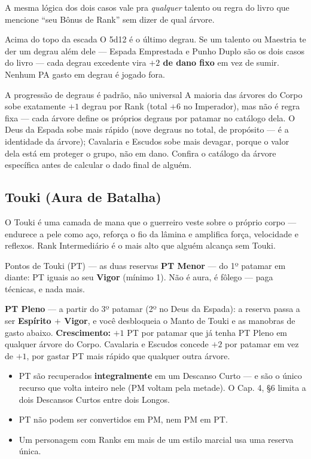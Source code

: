 A mesma lógica dos dois casos vale pra \emph{qualquer} talento ou regra do livro que
mencione \enquote{seu Bônus de Rank} sem dizer de qual árvore.

\begin{nota}{Acima do topo da escada}
    O 5d12 é o último degrau. Se um talento ou Maestria te der um degrau além dele --- Espada
    Emprestada e Punho Duplo são os dois casos do livro --- cada degrau excedente vira
    \textbf{$+2$ de dano fixo} em vez de sumir. Nenhum PA gasto em degrau é jogado fora.
\end{nota}

\begin{aviso}{A progressão de degraus é padrão, não universal}
    A maioria das árvores do Corpo sobe exatamente $+1$ degrau por Rank (total $+6$ no
    Imperador), mas não é regra fixa --- cada árvore define os próprios degraus por patamar
    no catálogo dela. O Deus da Espada sobe mais rápido (nove degraus no total, de propósito
    --- é a identidade da árvore); Cavalaria e Escudos sobe mais devagar, porque o valor
    dela está em proteger o grupo, não em dano. Confira o catálogo da árvore específica
    antes de calcular o dado final de alguém.
\end{aviso}

\subsection{Touki (Aura de Batalha)}

O Touki é uma camada de mana que o guerreiro veste sobre o próprio corpo --- endurece a pele
como aço, reforça o fio da lâmina e amplifica força, velocidade e reflexos. Rank
Intermediário é o mais alto que alguém alcança sem Touki.

\begin{nota}{Pontos de Touki (PT) --- as duas reservas}
    \textbf{PT Menor} --- do 1º patamar em diante: PT iguais ao seu \textbf{Vigor} (mínimo
    1). Não é aura, é fôlego --- paga técnicas, e nada mais.

    \medskip
    \textbf{PT Pleno} --- a partir do 3º patamar (2º no Deus da Espada): a reserva passa a
    ser \textbf{Espírito $+$ Vigor}, e você desbloqueia o Manto de Touki e as manobras de
    gasto abaixo. \textbf{Crescimento:} $+1$ PT por patamar que já tenha PT Pleno em
    qualquer árvore do Corpo. Cavalaria e Escudos concede $+2$ por patamar em vez de $+1$,
    por gastar PT mais rápido que qualquer outra árvore.

    \begin{itemize}
        \item PT são recuperados \textbf{integralmente} em um Descanso Curto --- e são o
              único recurso que volta inteiro nele (PM voltam pela metade). O Cap. 4, §6
              limita a dois Descansos Curtos entre dois Longos.
        \item PT não podem ser convertidos em PM, nem PM em PT.
        \item Um personagem com Ranks em mais de um estilo marcial usa uma reserva única.
    \end{itemize}
\end{nota}

